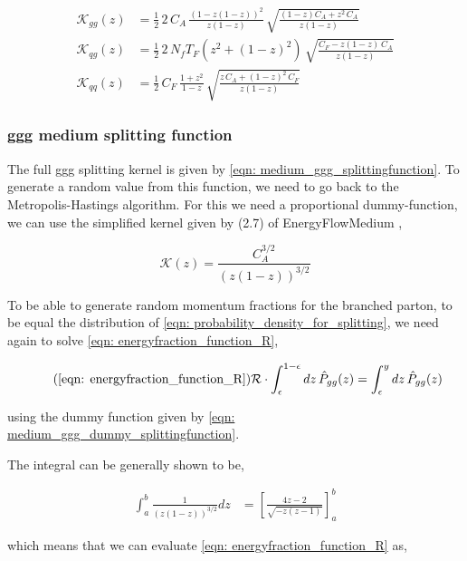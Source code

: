 \documentclass[main.tex]{subfiles}
\begin{document}
\begin{align}
    \mathcal{K}_{gg}(z) &= \frac{1}{2} \, 2\, C_A \, \frac{(1-z(1-z))^2}{z(1-z)} \, \sqrt{\frac{(1-z)C_A + z^2 \, C_A}{z(1-z)}}  \label{eqn: medium_ggg_splittingfunction} \\
    \mathcal{K}_{qg}(z) &= \frac{1}{2} \, 2\, N_f T_F \left(z^2 + (1-z)^2 \right) \, \sqrt{\frac{C_F - z(1-z) \, C_A}{z(1-z)}} \label{eqn: medium_qgg_splittingfunction} \\
    \mathcal{K}_{qq}(z) &= \frac{1}{2} \, C_F \, \frac{1+z^2}{1-z} \, \sqrt{\frac{z\, C_A + (1-z)^2 \, C_F}{z(1-z)}} \label{eqn: medium_qqg_splittingfunction}
\end{align}

\subsubsection{ggg medium splitting function}
The full ggg splitting kernel is given by \autoref{eqn: medium_ggg_splittingfunction}.
To generate a random value from this function, we need to go back to the Metropolis-Hastings algorithm. 
For this we need a proportional dummy-function, we can use the simplified kernel given by (2.7) of EnergyFlowMedium \cite{Energy_flow_medium_cascade_2016}, 

\begin{equation}\label{eqn: medium_ggg_dummy_splittingfunction}
    \mathcal{K}(z) = \frac{C_A^{3/2}}{(z(1-z))^{3/2}}
\end{equation}

To be able to generate random momentum fractions for the branched parton, to be equal the distribution of \autoref{eqn: probability_density_for_splitting}, we need again to solve \autoref{eqn: energyfraction_function_R},

\begin{equation}\tag{\ref{eqn: energyfraction_function_R}}
    \mathcal{R} \cdot \int_\epsilon^{1-\epsilon} dz \, \hat{P}_{gg}(z) = \int_\epsilon^{y}dz \, \hat{P}_{gg}(z)
\end{equation}

using the dummy function given by \autoref{eqn: medium_ggg_dummy_splittingfunction}.

The integral can be generally shown to be, 

\begin{align}
    \int_a^b \frac{1}{(z(1-z))^{3/2}}dz &= \left[ \frac{4z-2}{\sqrt{-z(z-1)}} \right]_a^b
\end{align}

which means that we can evaluate \autoref{eqn: energyfraction_function_R} as,
\end{document}

